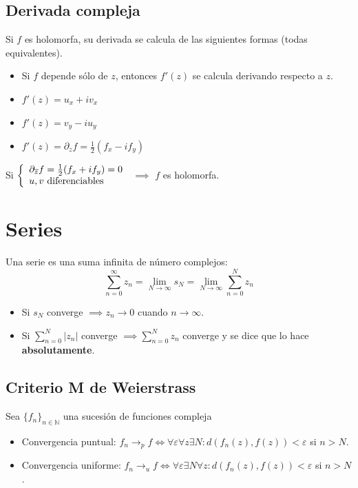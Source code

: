 \documentclass[paper=a4, fontsize=11pt]{scrartcl}
\numberwithin{equation}{section}
\numberwithin{figure}{section}
\numberwithin{table}{section}
\begin{document}
\subsection{Derivada compleja}
Si $f$ es holomorfa, su derivada se calcula de las siguientes formas (todas equivalentes).
\begin{itemize}
\item Si $f$ depende sólo de $z$, entonces $f'(z)$ se calcula derivando respecto a $z$.
\item $f'(z) = u_x + i v_x$
\item $f'(z) = v_y - i u_y$
\item $f'(z) = \partial_zf = \frac{1}{2}(f_x-if_y)$
\end{itemize}
\begin{center}
Si $\left\{\begin{array}{l l}\partial_{\overline{z}} f = \frac{1}{2}(f_x+if_y) = 0\\ u,v \text{ diferenciables}\end{array}\right.$ $\implies$ $f$ es holomorfa.
\end{center}


\section{Series}
Una serie es una suma infinita de número complejos:
$$\sum_{n=0}^\infty z_n = \lim_{N\to\infty} s_N = \lim_{N\to\infty}\sum_{n=0}^N z_n$$
\begin{itemize}
\item Si $s_N$ converge $\implies z_n\to 0$ cuando $n\to \infty$.
\item Si $\sum_{n=0}^N |z_n|$ converge $\implies \sum_{n=0}^N z_n$ converge y se dice que lo hace \textbf{absolutamente}.
\end{itemize}

\subsection{Criterio M de Weierstrass}
Sea $\{f_n\}_{n\in\mathbb{N}}$ una sucesión de funciones compleja
\begin{itemize}
\item Convergencia puntual: $f_n\to_p f \iff \forall \varepsilon \forall z \exists N: d(f_n(z), f(z))<\varepsilon$ si $n>N$.
\item Convergencia uniforme: $f_n\to_u f \iff \forall \varepsilon \exists N \forall z: d(f_n(z), f(z))<\varepsilon$ si $n>N$.
\end{itemize}
\end{document}
